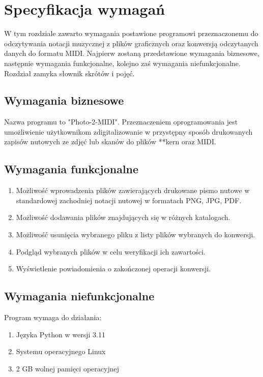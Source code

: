 \chapter{Specyfikacja wymagań}
W tym rozdziale zawarto wymagania postawione programowi przeznaczonemu do odczytywania notacji muzycznej z plików graficznych oraz konwersją odczytanych danych do formatu MIDI. Najpierw zostaną przedstawione wymagania biznesowe, następnie wymagania funkcjonalne, kolejno zaś wymagania niefunkcjonalne. Rozdział zamyka słownik skrótów i pojęć.

\section{Wymagania biznesowe}
Nazwa programu to "Photo-2-MIDI". Przeznaczeniem oprogramowania jest umożliwienie użytkownikom zdigitalizowanie w przystępny sposób drukowanych zapisów nutowych ze zdjęć lub skanów do plików **kern oraz MIDI.

\section{Wymagania funkcjonalne}
	\begin{enumerate}
		\item Możliwość wprowadzenia plików zawierających drukowane pismo nutowe w standardowej zachodniej notacji nutowej w formatach PNG, JPG, PDF.
		\item Możliwość dodawania plików znajdujących się w różnych katalogach.
		\item Możliwość usunięcia wybranego pliku z listy plików wybranych do konwersji.
		\item Podgląd wybranych plików w celu weryfikacji ich zawartości.
		\item Wyświetlenie powiadomienia o zakończonej operacji konwersji.
	\end{enumerate}
	
	
\section{Wymagania niefunkcjonalne}
Program wymaga do działania:
	\begin{enumerate}
		\item Języka Python w wersji 3.11
		\item Systemu operacyjnego Linux
		\item 2 GB wolnej pamięci operacyjnej
	\end{enumerate}
	
